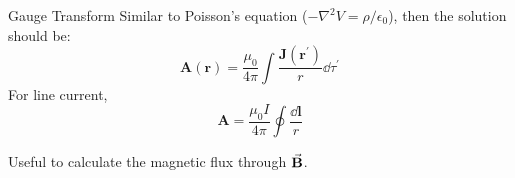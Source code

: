 \documentclass[9pt]{beamer}
\begin{document}

\begin{frame}{Gauge Transform}
    Similar to Poisson's equation ($-\nabla^2 V = \rho/\epsilon_0$), then the solution should be:
    \begin{equation*}
        \mathbf{A}(\mathbf{r})=\frac{\mu_{0}}{4 \pi} \int \frac{\mathbf{J}\left(\mathbf{r}^{\prime}\right)}{r} \dd \tau^{\prime}
    \end{equation*}
    For line current,
    \begin{equation*}
        \mathbf{A}=\frac{\mu_{0} I}{4 \pi} \oint \frac{\dd \mathbf{l}}{r}
    \end{equation*}

    Useful to calculate the magnetic flux through $\va{B}$.
\end{frame}
\end{document}
